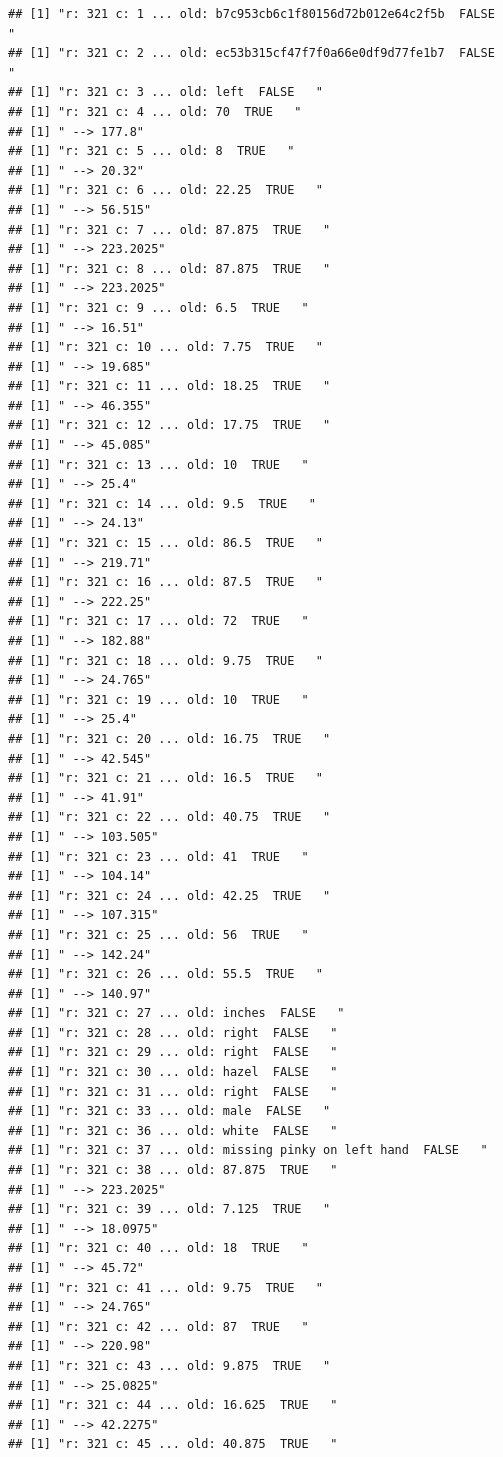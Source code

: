 \documentclass[]{article}
\begin{document}
\begin{verbatim}
## [1] "r: 321 c: 1 ... old: b7c953cb6c1f80156d72b012e64c2f5b  FALSE   "
## [1] "r: 321 c: 2 ... old: ec53b315cf47f7f0a66e0df9d77fe1b7  FALSE   "
## [1] "r: 321 c: 3 ... old: left  FALSE   "
## [1] "r: 321 c: 4 ... old: 70  TRUE   "
## [1] " --> 177.8"
## [1] "r: 321 c: 5 ... old: 8  TRUE   "
## [1] " --> 20.32"
## [1] "r: 321 c: 6 ... old: 22.25  TRUE   "
## [1] " --> 56.515"
## [1] "r: 321 c: 7 ... old: 87.875  TRUE   "
## [1] " --> 223.2025"
## [1] "r: 321 c: 8 ... old: 87.875  TRUE   "
## [1] " --> 223.2025"
## [1] "r: 321 c: 9 ... old: 6.5  TRUE   "
## [1] " --> 16.51"
## [1] "r: 321 c: 10 ... old: 7.75  TRUE   "
## [1] " --> 19.685"
## [1] "r: 321 c: 11 ... old: 18.25  TRUE   "
## [1] " --> 46.355"
## [1] "r: 321 c: 12 ... old: 17.75  TRUE   "
## [1] " --> 45.085"
## [1] "r: 321 c: 13 ... old: 10  TRUE   "
## [1] " --> 25.4"
## [1] "r: 321 c: 14 ... old: 9.5  TRUE   "
## [1] " --> 24.13"
## [1] "r: 321 c: 15 ... old: 86.5  TRUE   "
## [1] " --> 219.71"
## [1] "r: 321 c: 16 ... old: 87.5  TRUE   "
## [1] " --> 222.25"
## [1] "r: 321 c: 17 ... old: 72  TRUE   "
## [1] " --> 182.88"
## [1] "r: 321 c: 18 ... old: 9.75  TRUE   "
## [1] " --> 24.765"
## [1] "r: 321 c: 19 ... old: 10  TRUE   "
## [1] " --> 25.4"
## [1] "r: 321 c: 20 ... old: 16.75  TRUE   "
## [1] " --> 42.545"
## [1] "r: 321 c: 21 ... old: 16.5  TRUE   "
## [1] " --> 41.91"
## [1] "r: 321 c: 22 ... old: 40.75  TRUE   "
## [1] " --> 103.505"
## [1] "r: 321 c: 23 ... old: 41  TRUE   "
## [1] " --> 104.14"
## [1] "r: 321 c: 24 ... old: 42.25  TRUE   "
## [1] " --> 107.315"
## [1] "r: 321 c: 25 ... old: 56  TRUE   "
## [1] " --> 142.24"
## [1] "r: 321 c: 26 ... old: 55.5  TRUE   "
## [1] " --> 140.97"
## [1] "r: 321 c: 27 ... old: inches  FALSE   "
## [1] "r: 321 c: 28 ... old: right  FALSE   "
## [1] "r: 321 c: 29 ... old: right  FALSE   "
## [1] "r: 321 c: 30 ... old: hazel  FALSE   "
## [1] "r: 321 c: 31 ... old: right  FALSE   "
## [1] "r: 321 c: 33 ... old: male  FALSE   "
## [1] "r: 321 c: 36 ... old: white  FALSE   "
## [1] "r: 321 c: 37 ... old: missing pinky on left hand  FALSE   "
## [1] "r: 321 c: 38 ... old: 87.875  TRUE   "
## [1] " --> 223.2025"
## [1] "r: 321 c: 39 ... old: 7.125  TRUE   "
## [1] " --> 18.0975"
## [1] "r: 321 c: 40 ... old: 18  TRUE   "
## [1] " --> 45.72"
## [1] "r: 321 c: 41 ... old: 9.75  TRUE   "
## [1] " --> 24.765"
## [1] "r: 321 c: 42 ... old: 87  TRUE   "
## [1] " --> 220.98"
## [1] "r: 321 c: 43 ... old: 9.875  TRUE   "
## [1] " --> 25.0825"
## [1] "r: 321 c: 44 ... old: 16.625  TRUE   "
## [1] " --> 42.2275"
## [1] "r: 321 c: 45 ... old: 40.875  TRUE   "

\end{verbatim}
\end{document}

